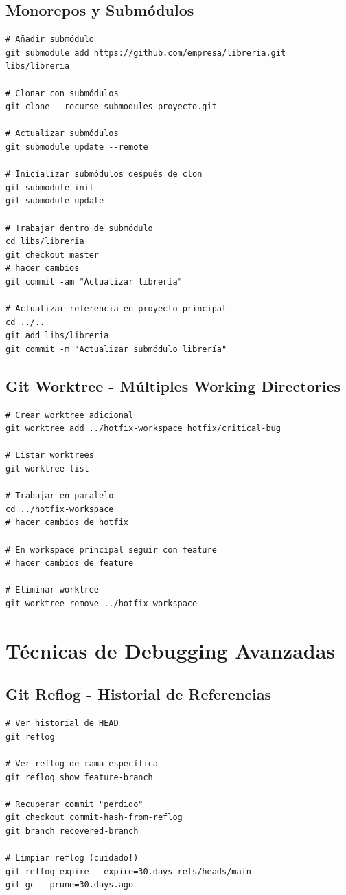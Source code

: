 \documentclass[12pt,a4paper]{article}
\begin{document}
\subsection{Monorepos y Submódulos}
\begin{lstlisting}[caption=Gestión de proyectos grandes]
# Añadir submódulo
git submodule add https://github.com/empresa/libreria.git libs/libreria

# Clonar con submódulos
git clone --recurse-submodules proyecto.git

# Actualizar submódulos
git submodule update --remote

# Inicializar submódulos después de clon
git submodule init
git submodule update

# Trabajar dentro de submódulo
cd libs/libreria
git checkout master
# hacer cambios
git commit -am "Actualizar librería"

# Actualizar referencia en proyecto principal
cd ../..
git add libs/libreria
git commit -m "Actualizar submódulo librería"
\end{lstlisting}

\subsection{Git Worktree - Múltiples Working Directories}
\begin{lstlisting}[caption=Trabajar en múltiples ramas simultáneamente]
# Crear worktree adicional
git worktree add ../hotfix-workspace hotfix/critical-bug

# Listar worktrees
git worktree list

# Trabajar en paralelo
cd ../hotfix-workspace
# hacer cambios de hotfix

# En workspace principal seguir con feature
# hacer cambios de feature

# Eliminar worktree
git worktree remove ../hotfix-workspace
\end{lstlisting}

\section{Técnicas de Debugging Avanzadas}

\subsection{Git Reflog - Historial de Referencias}
\begin{lstlisting}[caption=Recuperar commits perdidos]
# Ver historial de HEAD
git reflog

# Ver reflog de rama específica
git reflog show feature-branch

# Recuperar commit "perdido"
git checkout commit-hash-from-reflog
git branch recovered-branch

# Limpiar reflog (cuidado!)
git reflog expire --expire=30.days refs/heads/main
git gc --prune=30.days.ago
\end{lstlisting}
\end{document}
